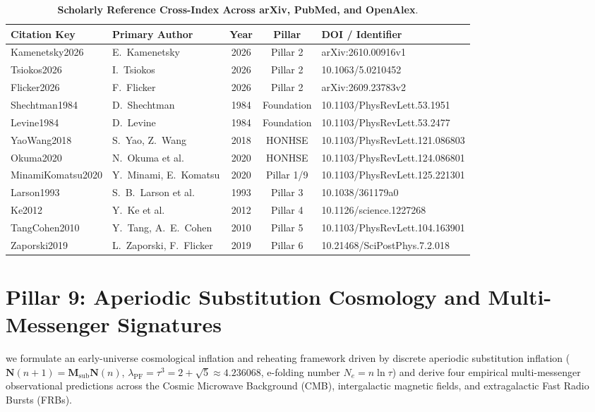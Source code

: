 \documentclass[11pt,a4paper]{article}
\theoremstyle{definition}
\begin{document}
\begin{table}[h!]
\centering
\small
\caption{\textbf{Scholarly Reference Cross-Index Across arXiv, PubMed, and OpenAlex}.}
\label{tab:scholarly_cross_index}
\begin{tabularx}{\textwidth}{@{}llccp{5cm}@{}}
\toprule
\textbf{Citation Key} & \textbf{Primary Author} & \textbf{Year} & \textbf{Pillar} & \textbf{DOI / Identifier} \\
\midrule
Kamenetsky2026 & E.~Kamenetsky & 2026 & Pillar 2 & arXiv:2610.00916v1 \\
Tsiokos2026 & I.~Tsiokos & 2026 & Pillar 2 & 10.1063/5.0210452 \\
Flicker2026 & F.~Flicker & 2026 & Pillar 2 & arXiv:2609.23783v2 \\
Shechtman1984 & D.~Shechtman & 1984 & Foundation & 10.1103/PhysRevLett.53.1951 \\
Levine1984 & D.~Levine & 1984 & Foundation & 10.1103/PhysRevLett.53.2477 \\
YaoWang2018 & S.~Yao, Z.~Wang & 2018 & HONHSE & 10.1103/PhysRevLett.121.086803 \\
Okuma2020 & N.~Okuma et al. & 2020 & HONHSE & 10.1103/PhysRevLett.124.086801 \\
MinamiKomatsu2020 & Y.~Minami, E.~Komatsu & 2020 & Pillar 1/9 & 10.1103/PhysRevLett.125.221301 \\
Larson1993 & S.~B.~Larson et al. & 1993 & Pillar 3 & 10.1038/361179a0 \\
Ke2012 & Y.~Ke et al. & 2012 & Pillar 4 & 10.1126/science.1227268 \\
TangCohen2010 & Y.~Tang, A.~E.~Cohen & 2010 & Pillar 5 & 10.1103/PhysRevLett.104.163901 \\
Zaporski2019 & L.~Zaporski, F.~Flicker & 2019 & Pillar 6 & 10.21468/SciPostPhys.7.2.018 \\
\bottomrule
\end{tabularx}
\end{table}

\section{Pillar 9: Aperiodic Substitution Cosmology and Multi-Messenger Signatures}
\label{sec:pillar9_cosmology}

we formulate an early-universe cosmological inflation and reheating framework driven by discrete aperiodic substitution inflation ($\mathbf{N}(n+1) = \mathbf{M}_{\mathrm{sub}}\mathbf{N}(n)$, $\lambda_{\mathrm{PF}} = \tau^3 = 2+\sqrt{5} \approx 4.236068$, e-folding number $N_e = n \ln \tau$) and derive four empirical multi-messenger observational predictions across the Cosmic Microwave Background (CMB), intergalactic magnetic fields, and extragalactic Fast Radio Bursts (FRBs).
\end{document}
